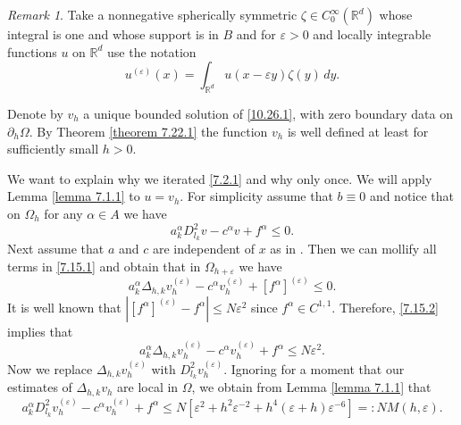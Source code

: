 \documentclass[11pt, reqno]{amsart}
\theoremstyle{definition}
\theoremstyle{remark}
\newtheorem{remark}{Remark}[section]
\begin{document}
\begin{remark}
                                         \label{remark 7.1.1}
Take a nonnegative spherically symmetric 
$\zeta\in C^{\infty}_{0}({\mathbb{R}}^{d})$
whose integral is one and whose support is in $B$
 and for $\varepsilon>0$ and
locally integrable functions $u$ on ${\mathbb{R}}^{d}$ use the notation
$$
u^{(\varepsilon)}(x)=\int_{{\mathbb{R}}^{d}}u(x-\varepsilon y)\zeta(y)\,dy.
$$
 
Denote by $v_{h} $
a unique bounded solution 
of \eqref{10.26.1}, with zero boundary data on $\partial_{h}\Omega$.
By Theorem \ref{theorem 7.22.1} the function $v_{h} $
is well defined at least for sufficiently small $h>0$.  

We want to explain why we iterated \eqref{7.2.1} and why
only once. We will apply Lemma \ref{lemma 7.1.1} to $u=v_{h}$. 
For simplicity assume that $b\equiv0$ and notice that on $\Omega_{h}$
for any $\alpha\in A$ we have
\begin{equation}
                                                   \label{7.15.1}
  a^{\alpha}_{k} D^{2}_{l_{k}}v  
-c^{\alpha} v +f^{\alpha} \leq0.
\end{equation}
Next assume that $a $  and $c$ are independent of $x$
as in \cite{DK05}.
Then we can mollify all terms in \eqref{7.15.1} and obtain that
in $\Omega_{h+\varepsilon}$ we have
\begin{equation}
                                                   \label{7.15.2}
a_{k}^{\alpha} \Delta_{h,k}v _{h}^{ (\varepsilon)} 
-c^{\alpha} v _{h}^{ (\varepsilon)} +[f^{\alpha} ]
^{ (\varepsilon)}\leq0.
\end{equation}
It is well known  that
$|[f^{\alpha} ]
^{ (\varepsilon)}-f^{\alpha}|\leq N\varepsilon^{2}$ since 
$f^{\alpha}\in C^{1,1}$. Therefore, \eqref{7.15.2} implies that
$$
a_{k}^{\alpha} \Delta_{h,k}v _{h}^{ (\varepsilon)} 
-c^{\alpha} v _{h}^{ (\varepsilon)} + f^{\alpha} 
 \leq N\varepsilon^{2}.
$$
Now we replace $\Delta_{h,k}v _{h}^{ (\varepsilon)}$ 
 with $D^{2}_{l_{k}}
v _{h}^{ (\varepsilon)}$. Ignoring for a moment that our estimates of
$\Delta_{h,k}v_{h}$ are local in $\Omega$, we obtain from
Lemma \ref{lemma 7.1.1} that
$$
a_{k}^{\alpha} D^{2}_{l_{k}}v _{h}^{ (\varepsilon)} 
-c^{\alpha} v _{h}^{ (\varepsilon)} + f^{\alpha} 
 \leq N[\varepsilon^{2}+ h^{2}\varepsilon^{-2}+h^{4}(\varepsilon+h)
\varepsilon^{-6}]=:NM(h,\varepsilon).
$$

 


\end{remark}
\end{document}

